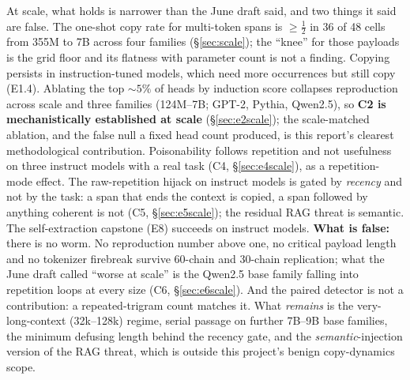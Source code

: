 \documentclass[11pt]{article}
\theoremstyle{plain}
\theoremstyle{definition}
\theoremstyle{remark}
\begin{document}
At scale, what holds is narrower than the June draft said, and two things it said are false.
The one-shot copy rate for multi-token spans is $\ge\tfrac12$ in 36 of 48 cells from 355M to
7B across four families (\S\ref{sec:scale}); the ``knee'' for those payloads is the grid floor
and its flatness with parameter count is not a finding. Copying persists in instruction-tuned
models, which need more occurrences but still copy (E1.4). Ablating the top $\sim5\%$ of heads
by induction score collapses reproduction across scale and three families (124M--7B; GPT-2,
Pythia, Qwen2.5), so \textbf{C2 is mechanistically established at scale} (\S\ref{sec:e2scale});
the scale-matched ablation, and the false null a fixed head count produced, is this report's
clearest methodological contribution. Poisonability follows repetition and not usefulness on
three instruct models with a real task (C4, \S\ref{sec:e4scale}), as a repetition-mode effect.
The raw-repetition hijack on instruct models is gated by \emph{recency} and not by the task: a
span that ends the context is copied, a span followed by anything coherent is not (C5,
\S\ref{sec:e5scale}); the residual RAG threat is semantic. The self-extraction capstone (E8)
succeeds on instruct models. \textbf{What is false:} there is no worm. No reproduction number
above one, no critical payload length and no tokenizer firebreak survive 60-chain and 30-chain
replication; what the June draft called ``worse at scale'' is the Qwen2.5 base family falling
into repetition loops at every size (C6, \S\ref{sec:e6scale}). And the paired detector is not a
contribution: a repeated-trigram count matches it. What \emph{remains} is the very-long-context
(32k--128k) regime, serial passage on further 7B--9B base families, the minimum defusing length
behind the recency gate, and the \emph{semantic}-injection version of the RAG threat, which is
outside this project's benign copy-dynamics scope.
\end{document}
